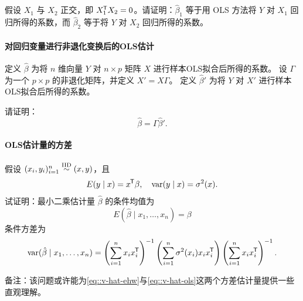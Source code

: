假设 $X_1$ 与 $X_2$ 正交，即 $X_1^{\mkern-1.5mu\mathsf{T}} X_2 = 0$。请证明：$\hat{\beta}_1$ 等于用 OLS 方法将 $Y$ 对 $X_1$ 回归所得的系数，而 $\hat{\beta}_2$ 等于将 $Y$ 对 $X_2$ 回归所得的系数。





\paragraph{对回归变量进行非退化变换后的OLS估计}\label{hw::ols-transform-regressors}



定义 $\hat{\beta}$ 为将 $n$ 维向量 $Y$ 对 $n\times p$ 矩阵 $X $ 进行样本OLS拟合后所得的系数。  
设 $\Gamma$ 为一个 $p\times p$ 的非退化矩阵，并定义 $X' = X\Gamma$。  
定义 $\hat{\beta} ' $ 为将 $Y$ 对 $X' $ 进行样本OLS拟合后所得的系数。 

请证明：
$$
 \hat{\beta}  =  \Gamma\hat{\beta} ' .
$$



\paragraph{ OLS估计量的方差}\label{hw::variance-ols-estimator}


假设 $(x_{i},y_{i})_{i=1}^{n} \stackrel{\textup{IID}}{\sim} (x,y)$，且 $$
E(y\mid x) = x^{\mkern-1.5mu\mathsf{T}} \beta,\quad \textup{var}(y\mid x) = \sigma^2(x).
$$  
试证明：最小二乘估计量 $\hat{\beta}$ 的条件均值为 $$
E( \hat{\beta} \mid x_1,\ldots, x_n ) = \beta 
$$条件方差为 $$
\textup{var}( \hat{\beta} \mid x_1,\ldots, x_n )
= \left(\sum_{i=1}^n x_{i}x_{i} ^{\mkern-1.5mu\mathsf{T}} \right)^{-1}
\left(\sum_{i=1}^n \sigma^2(x_i) x_{i}x_{i} ^{\mkern-1.5mu\mathsf{T}} \right)
\left(\sum_{i=1}^n x_{i}x_{i} ^{\mkern-1.5mu\mathsf{T}} \right)^{-1}.
$$

 


备注：该问题或许能为\eqref{eq::v-hat-ehw}与\eqref{eq::v-hat-ols}这两个方差估计量提供一些直观理解。

